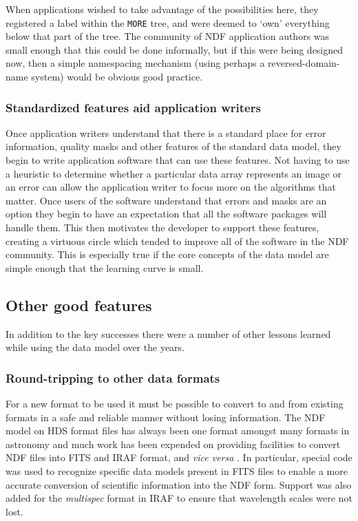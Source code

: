 \documentclass[final,authoryear,5p,times,twocolumn]{elsarticle}
\begin{document}
When applications wished to take advantage of the possibilities here,
they registered a label within the \texttt{MORE} tree, and were deemed
to `own' everything below that part of the tree.  The community of NDF
application authors was small enough that this could be done
informally, but if this were being designed now, then a simple
namespacing mechanism (using perhaps a reversed-domain-name system)
would be obvious good practice.

\subsubsection{Standardized features aid application writers}

Once application writers understand that there is a standard place for
error information, quality masks and other features of the standard
data model, they begin to write application software that can use
these features. Not having to use a heuristic to determine whether a
particular data array represents an image or an error can allow the
application writer to focus more on the algorithms that matter. Once
users of the software understand that errors and masks are an option
they begin to have an expectation that all the software packages will
handle them. This then motivates the developer to support these
features, creating a virtuous circle which tended to improve all of
the software in the NDF community.
This is especially true if the core concepts of the data
model are simple enough that the learning curve is small.

\subsection{Other good features}

In addition to the key successes there were a number of
other lessons learned while using the data model over the years.

\subsubsection{Round-tripping to other data formats}
\label{sec:round_trip}

For a new format to be used it must be possible to convert to and from
existing formats in a safe and reliable manner without losing
information.  The NDF model on HDS format files has always been one format amongst many
formats in astronomy and much work has been expended on providing
facilities to convert NDF files into FITS and IRAF format, and
\textit{vice versa} \citep{SUN55,1997STARB..19...14C}.  In particular,
special code was used to recognize specific data models present in
FITS files to enable a more accurate conversion of scientific
information into the NDF form. Support was also added for the
\emph{multispec} format in IRAF \citep{1993ASPC...52..467V} to ensure
that wavelength scales were not lost.
\end{document}
